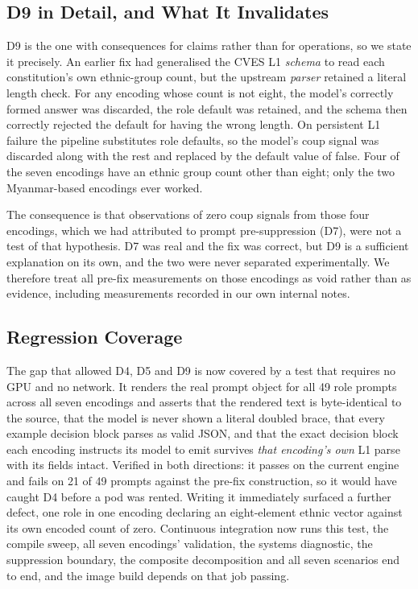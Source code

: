 \documentclass{ieeeaccess}
\begin{document}
\subsection{D9 in Detail, and What It Invalidates}
D9 is the one with consequences for claims rather than for operations,
so we state it precisely. An earlier fix had generalised the CVES L1
\emph{schema} to read each constitution's own ethnic-group count, but
the upstream \emph{parser} retained a literal length check. For any
encoding whose count is not eight, the model's correctly formed answer
was discarded, the role default was retained, and the schema then
correctly rejected the default for having the wrong length. On
persistent L1 failure the pipeline substitutes role defaults, so the
model's coup signal was discarded along with the rest and replaced by
the default value of false. Four of the seven encodings have an ethnic
group count other than eight; only the two Myanmar-based encodings ever
worked.

The consequence is that observations of zero coup signals from those
four encodings, which we had attributed to prompt pre-suppression (D7),
were not a test of that hypothesis. D7 was real and the fix was correct,
but D9 is a sufficient explanation on its own, and the two were never
separated experimentally. We therefore treat all pre-fix measurements on
those encodings as void rather than as evidence, including measurements
recorded in our own internal notes.

\subsection{Regression Coverage}
The gap that allowed D4, D5 and D9 is now covered by a test that
requires no GPU and no network. It renders the real prompt object for
all 49 role prompts across all seven encodings and asserts that the
rendered text is byte-identical to the source, that the model is never
shown a literal doubled brace, that every example decision block parses
as valid JSON, and that the exact decision block each encoding instructs
its model to emit survives \emph{that encoding's own} L1 parse with its
fields intact. Verified in both directions: it passes on the current
engine and fails on 21 of 49 prompts against the pre-fix construction,
so it would have caught D4 before a pod was rented. Writing it
immediately surfaced a further defect, one role in one encoding
declaring an eight-element ethnic vector against its own encoded count
of zero. Continuous integration now runs this test, the compile sweep,
all seven encodings' validation, the systems diagnostic, the suppression
boundary, the composite decomposition and all seven scenarios end to
end, and the image build depends on that job passing.
\end{document}
